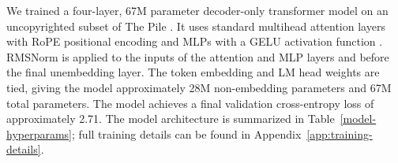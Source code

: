 \documentclass{article}
\begin{document}
We trained a four-layer, 67M parameter decoder-only transformer model on an uncopyrighted subset of The Pile \cite{gao2020pile}. It uses standard multihead attention layers \cite{vaswani2017attention} with RoPE positional encoding \cite{su2024roformer} and MLPs with a GELU activation function \cite{hendrycks2016gelu}. RMSNorm \cite{zhang2019rootmeansquarelayer} is applied to the inputs of the attention and MLP layers \cite{xiong2020layernormalization} and before the final unembedding layer. The token embedding and LM head weights are tied, giving the model approximately 28M non-embedding parameters and 67M total parameters. The model achieves a final validation cross-entropy loss of approximately 2.71. The model architecture is summarized in Table~\ref{model-hyperparams}; full training details can be found in Appendix~\ref{app:training-details}.

\end{document}
